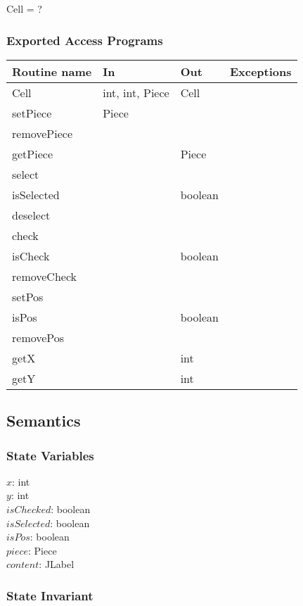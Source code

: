 \documentclass[12pt]{article}
\begin{document}
Cell = ?

\subsubsection* {Exported Access Programs}

\begin{tabular}{| l | l | l | l |}
\hline
\textbf{Routine name} & \textbf{In} & \textbf{Out} & \textbf{Exceptions}\\
\hline
Cell & int, int, Piece & Cell & ~\\
\hline
setPiece & Piece & ~ & ~\\
\hline
removePiece & ~ & ~ & ~\\
\hline
getPiece & ~ & Piece & ~\\
\hline 
select & ~ & ~ & ~\\
\hline 
isSelected & ~ & boolean & ~\\
\hline 
deselect & ~ & ~ & ~\\
\hline 
check & ~ & ~ & ~\\
\hline 
isCheck & ~ & boolean & ~\\
\hline 
removeCheck & ~ & ~ & ~\\
\hline
setPos & ~ & ~ & ~\\
\hline
isPos & ~ & boolean & ~\\
\hline
removePos & ~ & ~ & ~ \\
\hline
getX & ~ & int & ~\\
\hline
getY & ~ & int & ~\\
\hline
\end{tabular}
\newpage 
\subsection* {Semantics}

\subsubsection* {State Variables}

$x$: int\\
$y$: int\\
$isChecked$: boolean\\
$isSelected$: boolean\\
$isPos$: boolean\\
$piece$: Piece\\
$content$: JLabel\\

\subsubsection* {State Invariant}
\end{document}
